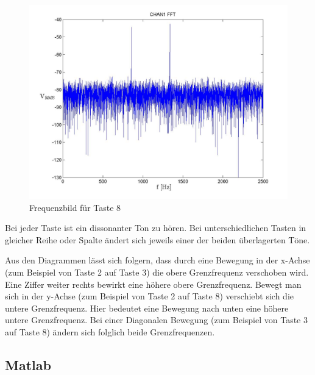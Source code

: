 \documentclass[10pt]{scrreprt}
\begin{document}
\begin{center}
\begin{figure}[H]
            \end{figure}
            \begin{figure}[H]
                \includegraphics[width=\textwidth]{Screenshot_GUI_431_T8_chan1_fft.jpg}
                \caption{Frequenzbild für Taste 8}
            \end{figure}
        \end{center}
        Bei jeder Taste ist ein dissonanter Ton zu hören. Bei unterschiedlichen Tasten
        in gleicher Reihe oder Spalte ändert sich jeweils einer der beiden überlagerten
        Töne.

        Aus den Diagrammen lässt sich folgern, dass durch eine Bewegung in der x-Achse
        (zum Beispiel von Taste 2 auf Taste 3) die obere Grenzfrequenz verschoben wird. Eine Ziffer weiter
        rechts bewirkt eine höhere obere Grenzfrequenz.
        Bewegt man sich in der y-Achse (zum Beispiel von Taste 2 auf Taste 8)
        verschiebt sich die untere Grenzfrequenz. Hier bedeutet eine Bewegung
        nach unten eine höhere untere Grenzfrequenz.
        Bei einer Diagonalen Bewegung (zum Beispiel von Taste 3 auf Taste 8) ändern
        sich folglich beide Grenzfrequenzen.

        \subsection{Matlab}
\end{document}

